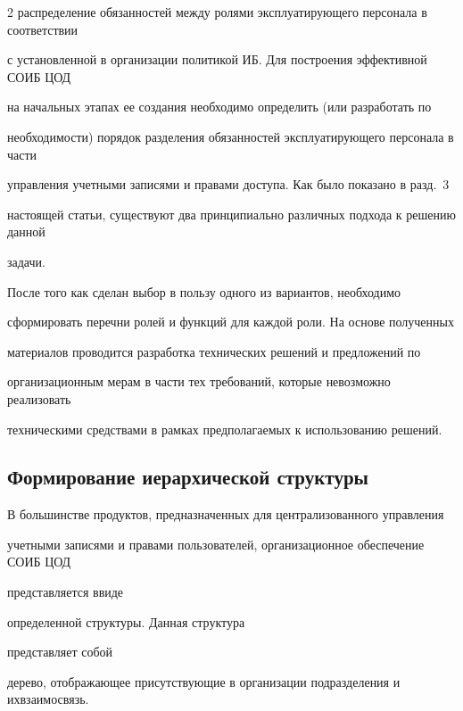 \begin{multicols}{2}
распределение обязанностей между ролями эксплуатирующего персонала в соответствии 


с уста\-нов\-лен\-ной в организации политикой ИБ. Для построения эффективной СОИБ ЦОД 


на начальных этапах ее создания необходимо определить (или разработать по 


не\-об\-хо\-ди\-мости) порядок разделения обязанностей экс\-плу\-а\-ти\-ру\-юще\-го персонала в части 


управления учетными записями и правами доступа. Как было показано в разд.~3 


настоящей статьи, существуют два принципиально различных подхода к решению данной 


за\-дачи.


{





}       


       После того как сделан выбор в пользу одного из вариантов, необходимо 


сформировать перечни ролей и функций для каждой роли. На основе полученных 


материалов проводится разработка технических решений и предложений по 


организационным мерам в части тех требований, которые невозможно реализовать 


техническими средствами в рамках предполагаемых к использованию решений.





\subsection{Формирование иерархической структуры}





       В большинстве продуктов, предназначенных для централизованного управления 


учетными записями и правами пользователей, организационное обеспечение СОИБ ЦОД 


представляется в\linebreak виде


определенной структуры. Данная структура\linebreak


представляет собой 


дерево, отображающее присутствующие в организации подразделения и их\linebreak взаимосвязь. 



\end{multicols}
